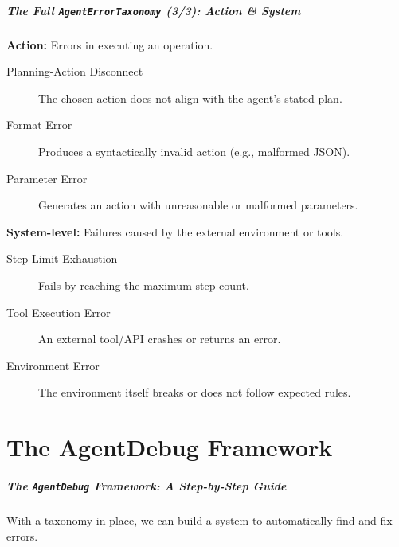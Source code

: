 \documentclass[10pt]{beamer}
\begin{document}
\begin{frame}[fragile]
  \frametitle{The Full \texttt{AgentErrorTaxonomy} (3/3): Action \& System}
  \textbf{Action:} Errors in executing an operation.
  \begin{description}
    \item[Planning-Action Disconnect] The chosen action does not align with the agent's stated plan.
    \item[Format Error] Produces a syntactically invalid action (e.g., malformed JSON).
    \item[Parameter Error] Generates an action with unreasonable or malformed parameters.
  \end{description}
  
  \vfill
  
  \textbf{System-level:} Failures caused by the external environment or tools.
  \begin{description}
    \item[Step Limit Exhaustion] Fails by reaching the maximum step count.
    \item[Tool Execution Error] An external tool/API crashes or returns an error.
    \item[Environment Error] The environment itself breaks or does not follow expected rules.
  \end{description}
\end{frame}

\part{The AgentDebug Framework}

\begin{frame}
  \frametitle{The \texttt{AgentDebug} Framework: A Step-by-Step Guide}
  With a taxonomy in place, we can build a system to automatically find and fix errors.
  
  \begin{center}
  \end{center}
\end{frame}
\end{document}

